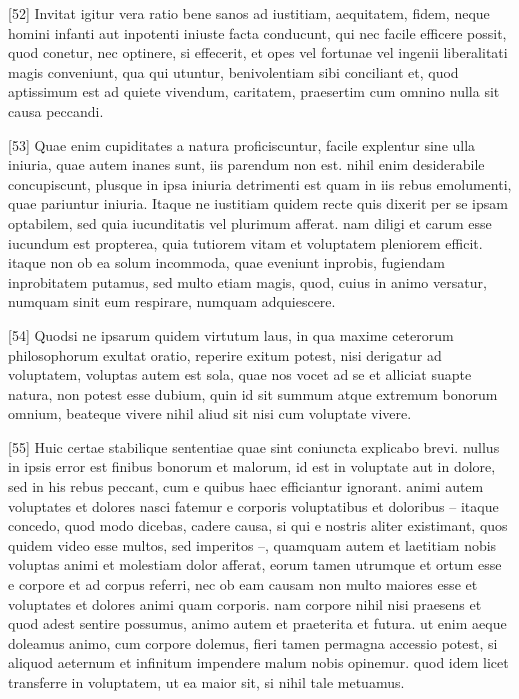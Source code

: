 \documentclass{article}
\begin{document}
[52] Invitat igitur vera ratio bene sanos ad iustitiam, aequitatem, fidem, neque homini infanti aut inpotenti iniuste facta conducunt, qui nec facile efficere possit, quod conetur, nec optinere, si effecerit, et opes vel fortunae vel ingenii liberalitati magis conveniunt, qua qui utuntur, benivolentiam sibi conciliant et, quod aptissimum est ad quiete vivendum, caritatem, praesertim cum omnino nulla sit causa peccandi.

[53] Quae enim cupiditates a natura proficiscuntur, facile explentur sine ulla iniuria, quae autem inanes sunt, iis parendum non est. nihil enim desiderabile concupiscunt, plusque in ipsa iniuria detrimenti est quam in iis rebus emolumenti, quae pariuntur iniuria. Itaque ne iustitiam quidem recte quis dixerit per se ipsam optabilem, sed quia iucunditatis vel plurimum afferat. nam diligi et carum esse iucundum est propterea, quia tutiorem vitam et voluptatem pleniorem efficit. itaque non ob ea solum incommoda, quae eveniunt inprobis, fugiendam inprobitatem putamus, sed multo etiam magis, quod, cuius in animo versatur, numquam sinit eum respirare, numquam adquiescere.

[54] Quodsi ne ipsarum quidem virtutum laus, in qua maxime ceterorum philosophorum exultat oratio, reperire exitum potest, nisi derigatur ad voluptatem, voluptas autem est sola, quae nos vocet ad se et alliciat suapte natura, non potest esse dubium, quin id sit summum atque extremum bonorum omnium, beateque vivere nihil aliud sit nisi cum voluptate vivere.

[55] Huic certae stabilique sententiae quae sint coniuncta explicabo brevi. nullus in ipsis error est finibus bonorum et malorum, id est in voluptate aut in dolore, sed in his rebus peccant, cum e quibus haec efficiantur ignorant. animi autem voluptates et dolores nasci fatemur e corporis voluptatibus et doloribus -- itaque concedo, quod modo dicebas, cadere causa, si qui e nostris aliter existimant, quos quidem video esse multos, sed imperitos --, quamquam autem et laetitiam nobis voluptas animi et molestiam dolor afferat, eorum tamen utrumque et ortum esse e corpore et ad corpus referri, nec ob eam causam non multo maiores esse et voluptates et dolores animi quam corporis. nam corpore nihil nisi praesens et quod adest sentire possumus, animo autem et praeterita et futura. ut enim aeque doleamus animo, cum corpore dolemus, fieri tamen permagna accessio potest, si aliquod aeternum et infinitum impendere malum nobis opinemur. quod idem licet transferre in voluptatem, ut ea maior sit, si nihil tale metuamus.
\end{document}
